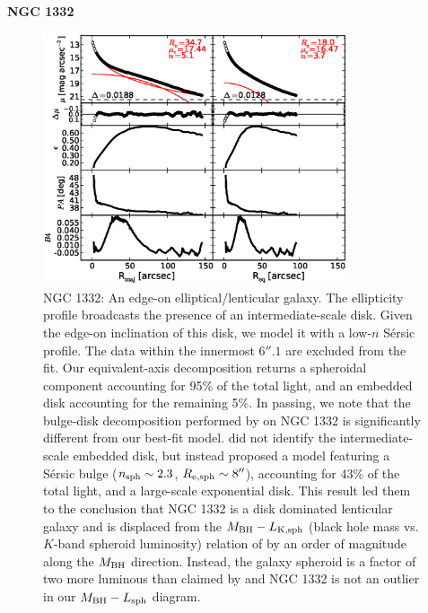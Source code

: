 \documentclass[preprint2]{emulateapj}
\newcommand{\fitfigurewidth}{0.8\textwidth}
\begin{document}
  \clearpage\newpage\noindent
  {\bf NGC 1332 \\}

  \begin{figure}[h]
  \begin{center}
  \includegraphics[width=\fitfigurewidth]{n1332_1Dfit.eps}
  \caption{NGC 1332: 
  An edge-on elliptical/lenticular galaxy. 
  The ellipticity profile broadcasts the presence of an intermediate-scale disk. 
  Given the edge-on inclination of this disk, we model it with a low-$n$ S\'ersic profile. 
  The data within the innermost $6''.1$ are excluded from the fit.
  Our equivalent-axis decomposition returns a spheroidal component accounting for 95\% of the total light,
  and an embedded disk accounting for the remaining 5\%.
  In passing, we note that the bulge-disk decomposition performed by \citet{rusli2011} on NGC 1332 
  is significantly different from our best-fit model.
  \citet{rusli2011} did not identify the intermediate-scale embedded disk, 
  but instead proposed a model featuring a S\'ersic bulge ($n_{\rm sph} \sim 2.3$, $R_{\rm e,sph} \sim 8''$), accounting for 43\% of the total light, 
  and a large-scale exponential disk. 
  This result led them to the conclusion that NGC 1332 is a disk dominated lenticular galaxy 
  and is displaced from the $M_{\rm BH} - L_{\rm K,sph}$ (black hole mass vs. $K$-band spheroid luminosity) relation of \citet{marconihunt2003} 
  by an order of magnitude along the $M_{\rm BH}$ direction.
  Instead, the galaxy spheroid is a factor of two more luminous than claimed by \citet{rusli2011} and  
  NGC 1332 is not an outlier in our $M_{\rm BH} - L_{\rm sph}$ diagram. \\
  }
  \end{center}
  \end{figure}
\end{document}
